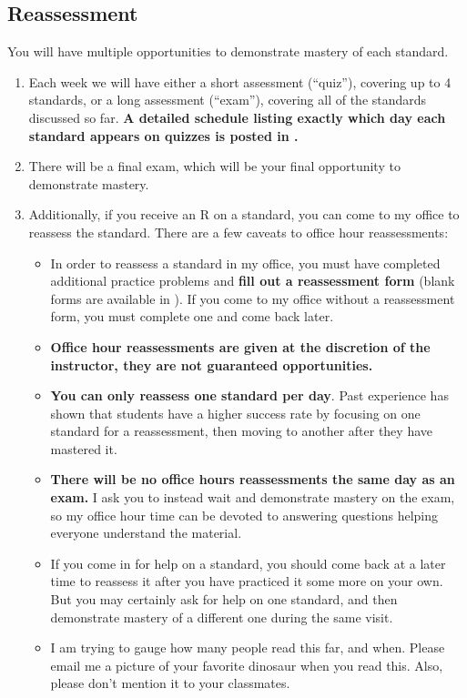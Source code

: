 \documentclass{article}
\begin{document}
    \subsection*{\fontsize{10}{12}\selectfont Reassessment}
    You will have multiple opportunities to demonstrate mastery of each standard.  
    \begin{enumerate}[1)]
    \item Each week we will have either a short assessment (``quiz''), covering  up to 4 standards, or a long assessment (``exam''), covering all of the standards discussed so far.  {\bf A detailed schedule listing exactly which day each standard appears on quizzes is posted in \LMS.}
    \item There will be a final exam, which will be your final opportunity to demonstrate mastery. 
    \item Additionally, if you receive an R on a standard, you can come to my office to reassess the standard.  There are a few caveats to office hour reassessments:
    \begin{itemize}
    \item In order to reassess a standard in my office, you must have completed additional practice problems and {\bf fill out a reassessment form} (blank forms are available in \LMS).  If you come to my office without a reassessment form, you must complete one and come back later.
    \item \textbf{Office hour reassessments are given at the discretion of the instructor, they are not guaranteed opportunities.}   
    \item \textbf{You can only reassess one standard per day}.  Past experience has shown that students have a higher success rate by focusing on one standard for a reassessment, then moving to another after they have mastered it.  
    \item \textbf{There will be no office hours reassessments the same day as an exam.}  I ask you to instead wait and demonstrate mastery on the exam, so my office hour time can be devoted to answering questions helping everyone understand the material.
    \item If you come in for help on a standard, you should come back at a later time to reassess it after you have practiced it some more on your own.  But you may certainly ask for help on one standard, and then demonstrate mastery of a different one during the same visit.
    \item I am trying to gauge how many people read this far, and when. Please email me a picture of your favorite dinosaur when you read this. Also, please don't mention it to your classmates.

\end{itemize}
\end{enumerate}
\end{document}

